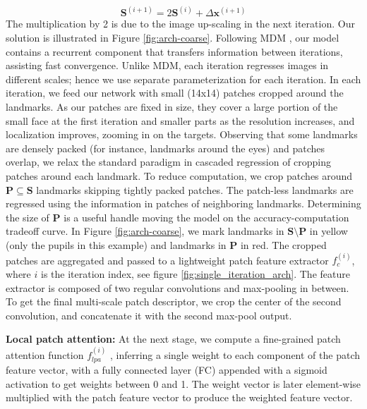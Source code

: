 \documentclass[9pt,twocolumn]{extarticle}
\begin{document}
\begin{equation}
\mathbf{S}^{(i+1)} = 2\mathbf{S}^{(i)} + \Delta \mathbf{x}^{(i+1)}
\label{eq:1}
\end{equation}
The multiplication by 2 is due to the image up-scaling in the next iteration.
Our solution is illustrated in Figure \ref{fig:arch-coarse}.
Following MDM \cite{trigeorgis2016mnemonic}, our model contains a recurrent component that transfers information between iterations, assisting fast convergence. Unlike MDM, each iteration regresses images in different scales; hence we use separate parameterization for each iteration.
In each iteration, we feed our network with small (14x14) patches cropped around the landmarks. As our patches are fixed in size, they cover a large portion of the small face at the first iteration and smaller parts as the resolution increases, and localization improves, zooming in on the targets. Observing that some landmarks are densely packed (for instance, landmarks around the eyes) and patches overlap, we relax the standard paradigm in cascaded regression of cropping patches around each landmark. To reduce computation, we crop patches around $\mathbf{P} \subseteq \mathbf{S}$ landmarks skipping tightly packed patches. The patch-less landmarks are regressed using the information in patches of neighboring landmarks. Determining the size of $\mathbf{P}$ is a useful handle moving the model on the accuracy-computation tradeoff curve.
In Figure \ref{fig:arch-coarse}, we mark landmarks in $\mathbf{S} \setminus \mathbf{P}$ in yellow (only the pupils in this example) and landmarks in $\mathbf{P}$ in red. The cropped patches are aggregated and passed to a lightweight patch feature extractor $f_c^{(i)}$, where $i$ is the iteration index, see figure \ref{fig:single_iteration_arch}. The feature extractor is composed of two regular convolutions and max-pooling in between. To get the final multi-scale patch descriptor, we crop the center of the second convolution, and concatenate it with the second max-pool output.

\textbf{Local patch attention:} At the next stage, we compute a fine-grained patch attention function $f_{lpa}^{(i)}$ , inferring a single weight to each component of the patch feature vector, with a fully connected layer (FC) appended with a sigmoid activation to get weights between 0 and 1. The weight vector is later element-wise multiplied with the patch feature vector to produce the weighted feature vector.
\end{document}
